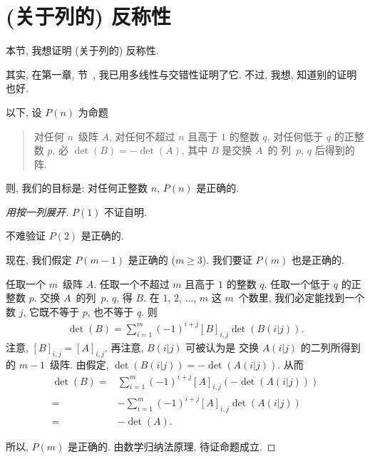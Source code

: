 \section{(关于列的) 反称性}

本节, 我想证明 (关于列的) 反称性.

其实, 在第一章, 节~,
我已用多线性与交错性证明了它.
不过, 我想, 知道别的证明也好.



以下, 设 \(P(n)\) 为命题
\begin{quotation}
    对任何 \(n\)~级阵 \(A\),
    对任何不超过 \(n\) 且高于 \(1\) 的整数 \(q\),
    对任何低于 \(q\) 的正整数 \(p\),
    必 \(\det {(B)} = -\det {(A)}\),
    其中 \(B\) 是交换 \(A\)~的%
    列~\(p\), \(q\) 后得到的阵.
\end{quotation}
则, 我们的目标是:
对任何正整数 \(n\), \(P(n)\) 是正确的.

\begin{proof}[用按一列展开]
    \(P(1)\) 不证自明.

    不难验证 \(P(2)\) 是正确的.

    现在, 我们假定 \(P(m-1)\) 是正确的 (\(m \geq 3\)).
    我们要证 \(P(m)\) 也是正确的.

    任取一个 \(m\)~级阵 \(A\).
    任取一个不超过 \(m\) 且高于 \(1\) 的整数 \(q\).
    任取一个低于 \(q\) 的正整数 \(p\).
    交换 \(A\)~的列~\(p\), \(q\), 得 \(B\).
    在 \(1\), \(2\), \(\dots\), \(m\) 这 \(m\)~个数里,
    我们必定能找到一个数 \(j\),
    它既不等于 \(p\), 也不等于 \(q\).
    则
    \begin{align*}
        \det {(B)}
        = \sum_{i = 1}^{m}
        {(-1)^{i + j} [B]_{i,j} \det {(B(i|j))}}.
    \end{align*}
    注意, \([B]_{i,j} = [A]_{i,j}\).
    再注意, \(B(i|j)\) 可被认为是%
    交换 \(A(i|j)\) 的二列所得到的 \(m-1\)~级阵.
    由假定, \(\det {(B(i|j))} = -\det {(A(i|j))}\).
    从而
    \begin{align*}
        \det {(B)}
        = {} &
        \sum_{i = 1}^{m}
        {(-1)^{i + j} [A]_{i,j} (-\det {(A(i|j))})}
        \\
        = {} &
        {-\sum_{i = 1}^{m}
        {(-1)^{i + j} [A]_{i,j} \det {(A(i|j))}}}
        \\
        = {} &
        {-\det {(A)}}.
    \end{align*}

    所以, \(P(m)\) 是正确的.
    由数学归纳法原理, 待证命题成立.
\end{proof}

